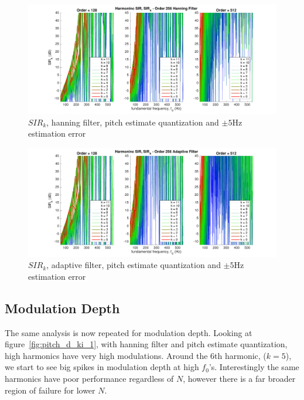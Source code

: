 \documentclass [11pt, proquest,oneside] {ganter_thesis}[2015/03/03]
\begin{document}
\begin{figure}[!ht]
  \centering
    \includegraphics[width=1\textwidth]{pitch_sir_k_1_error5}
    \caption{$SIR_k$, hanning filter, pitch estimate quantization and $\pm5$Hz estimation error}\label{fig:pitch_sir_k_1_error5}
\end{figure}

\begin{figure}[!ht]
  \centering
    \includegraphics[width=1\textwidth]{pitch_sir_k_2_error5}
    \caption{$SIR_k$, adaptive filter, pitch estimate quantization and $\pm5$Hz estimation error}\label{fig:pitch_sir_k_2_error5}
\end{figure}

\clearpage

\subsection{Modulation Depth}

The same analysis is now repeated for modulation depth.  Looking at figure~\ref{fig:pitch_d_ki_1}, with hanning filter and pitch estimate quantization, high harmonics have very high modulations.  Around the 6th harmonic, ($k = 5$), we start to see big spikes in modulation depth at high $f_0$'s.  Interestingly the same harmonics have poor performance regardless of $N$, however there is a far broader region of failure for lower $N$.
\end{document}
